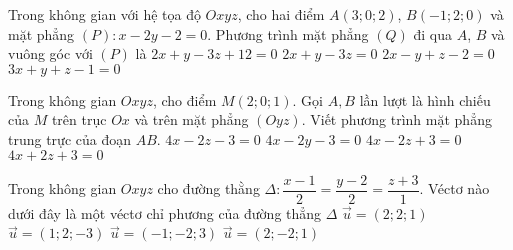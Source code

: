\begin{ex}%
Trong không gian với hệ tọa độ $O x y z$, cho hai điểm $A (3;0;2) $, $ B(-1;2;0) $ và mặt phẳng $(P)\colon x-2y-2=0$. Phương trình mặt phẳng $(Q)$ đi qua $A$, $B$ và vuông góc với $(P)$ là
\choice
{$2x + y -3z +12 =0$}
{\True $2x + y -3z =0$}
{$2x - y + z -2 =0$}
{$3x + y +z -1 =0$}
\end{ex}

\begin{ex}%
Trong không gian $Oxyz$, cho điểm $M\left( 2;0;1 \right)$. Gọi $A,B$ lần lượt là hình chiếu của $M$ trên trục $Ox$ và trên mặt phẳng $\left( Oyz \right)$. Viết phương trình mặt phẳng trung trực của đoạn $AB$.
\choice
{\True  $4x-2z-3=0$}
{ $4x-2y-3=0$}
{ $4x-2z+3=0$}
{ $4x+2z+3=0$}
\end{ex}

\begin{ex}%
Trong không gian $Oxyz$ cho đường thằng $\Delta: \dfrac{x-1}{2}=\dfrac{y-2}{2}=\dfrac{z+3}{1}$. Véctơ nào dưới đây là một véctơ chỉ phương của đường thẳng $\Delta$
\choice
{\True $\overrightarrow{u}=\left( 2;2;1\right) $}
{$\overrightarrow{u}=\left( 1;2;-3\right) $}
{$\overrightarrow{u}=\left( -1;-2;3\right) $}
{$\overrightarrow{u}=\left( 2;-2;1 \right) $}
\end{ex}

